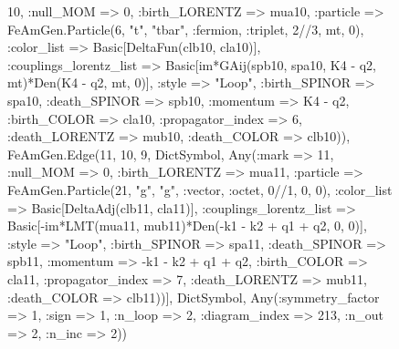 \documentclass{revtex4}
\begin{document}
\begin{figure}[!htb]
\begin{center}
{10, :null_MOM => 0, :birth_LORENTZ => mua10, :particle => FeAmGen.Particle(6, "t", "tbar", :fermion, :triplet, 2//3, mt, 0), :color_list => Basic[DeltaFun(clb10, cla10)], :couplings_lorentz_list => Basic[im*GAij(spb10, spa10, K4 - q2, mt)*Den(K4 - q2, mt, 0)], :style => "Loop", :birth_SPINOR => spa10, :death_SPINOR => spb10, :momentum => K4 - q2, :birth_COLOR => cla10, :propagator_index => 6, :death_LORENTZ => mub10, :death_COLOR => clb10)), FeAmGen.Edge(11, 10, 9, Dict{Symbol, Any}(:mark => 11, :null_MOM => 0, :birth_LORENTZ => mua11, :particle => FeAmGen.Particle(21, "g", "g", :vector, :octet, 0//1, 0, 0), :color_list => Basic[DeltaAdj(clb11, cla11)], :couplings_lorentz_list => Basic[-im*LMT(mua11, mub11)*Den(-k1 - k2 + q1 + q2, 0, 0)], :style => "Loop", :birth_SPINOR => spa11, :death_SPINOR => spb11, :momentum => -k1 - k2 + q1 + q2, :birth_COLOR => cla11, :propagator_index => 7, :death_LORENTZ => mub11, :death_COLOR => clb11))], Dict{Symbol, Any}(:symmetry_factor => 1, :sign => 1, :n_loop => 2, :diagram_index => 213, :n_out => 2, :n_inc => 2)) 
}
\end{center}
\end{figure}
\end{document}
